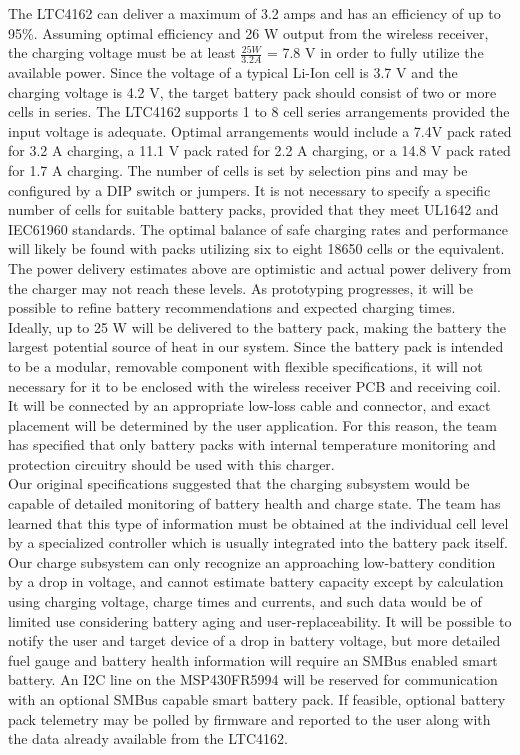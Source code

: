 \documentclass[12pt]{article}
\begin{document}
\indent
The LTC4162 can deliver a maximum of 3.2 amps and has an efficiency of up to 95\%. Assuming optimal efficiency and 26 W output from the wireless receiver, the charging voltage must be at least $\frac{25 W}{3.2 A}$ = 7.8 V in order to fully utilize the available power. Since the voltage of a typical Li-Ion cell is 3.7 V and the charging voltage is 4.2 V, the target battery pack should consist of two or more cells in series. The LTC4162 supports 1 to 8 cell series arrangements provided the input voltage is adequate. Optimal arrangements would include a 7.4V pack rated for 3.2 A charging, a 11.1 V pack rated for 2.2 A charging, or a 14.8 V pack rated for 1.7 A charging. The number of cells is set by selection pins and may be configured by a DIP switch or jumpers. It is not necessary to specify a specific number of cells for suitable battery packs, provided that they meet UL1642 and IEC61960 standards. The optimal balance of safe charging rates and performance will likely be found with packs utilizing six to eight 18650 cells or the equivalent. The power delivery estimates above are optimistic and actual power delivery from the charger may not reach these levels. As prototyping progresses, it will be possible to refine battery recommendations and expected charging times.\\

\indent
Ideally, up to 25 W will be delivered to the battery pack, making the battery the largest potential source of heat in our system. Since the battery pack is intended to be a modular, removable component with flexible specifications, it will not necessary for it to be enclosed with the wireless receiver PCB and receiving coil. It will be connected by an appropriate low-loss cable and connector, and exact placement will be determined by the user application. For this reason, the team has specified that only battery packs with internal temperature monitoring and protection circuitry should be used with this charger.\\

\indent
Our original specifications suggested that the charging subsystem would be capable of detailed monitoring of battery health and charge state. The team has learned that this type of information must be obtained at the individual cell level by a specialized controller which is usually integrated into the battery pack itself. Our charge subsystem can only recognize an approaching low-battery condition by a drop in voltage, and cannot estimate battery capacity except by calculation using charging voltage, charge times and currents, and such data would be of limited use considering battery aging and user-replaceability. It will be possible to notify the user and target device of a drop in battery voltage, but more detailed fuel gauge and battery health information will require an SMBus enabled smart battery. An I2C line on the MSP430FR5994 will be reserved for communication with an optional SMBus capable smart battery pack. If feasible, optional battery pack telemetry may be polled by firmware and reported to the user along with the data already available from the LTC4162.\\
\end{document}
